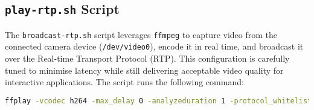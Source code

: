 \subsection{\texttt{play-rtp.sh} Script}

The \texttt{broadcast-rtp.sh} script leverages \texttt{ffmpeg} to capture video from the connected camera device (\texttt{/dev/video0}), encode it in real time, and broadcast it over the Real-time Transport Protocol (RTP). This configuration is carefully tuned to minimise latency while still delivering acceptable video quality for interactive applications. The script runs the following command:

\begin{lstlisting}[language=bash]
  ffplay -vcodec h264 -max_delay 0 -analyzeduration 1 -protocol_whitelist file,udp,rtp -fflags nobuffer -strict experimental -framedrop -flags low_delay -probesize 32 -vf setpts=0 -sync ext rtp-h264.sdp
 \end{lstlisting}


